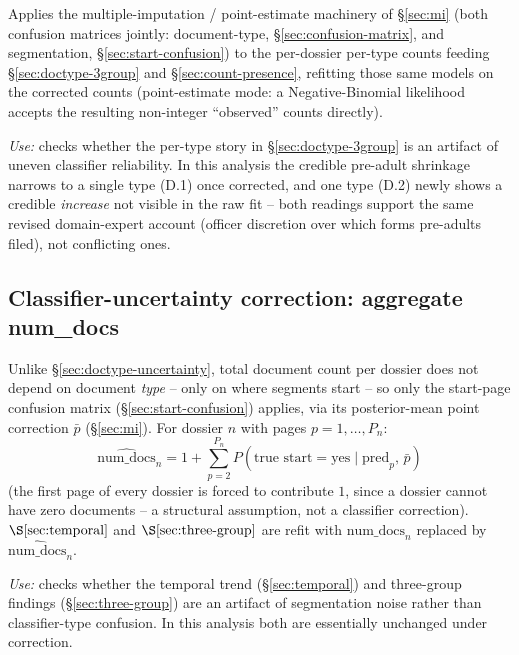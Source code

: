 Applies the multiple-imputation / point-estimate machinery of
\S\ref{sec:mi} (both confusion matrices jointly: document-type,
\S\ref{sec:confusion-matrix}, and segmentation, \S\ref{sec:start-confusion})
to the per-dossier per-type counts feeding \S\ref{sec:doctype-3group} and
\S\ref{sec:count-presence}, refitting those same models on the corrected
counts (point-estimate mode: a Negative-Binomial likelihood accepts the
resulting non-integer ``observed'' counts directly).

\textit{Use:} checks whether the per-type story in \S\ref{sec:doctype-3group}
is an artifact of uneven classifier reliability. In this analysis the
credible pre-adult shrinkage narrows to a single type (D.1) once corrected,
and one type (D.2) newly shows a credible \emph{increase} not visible in the
raw fit -- both readings support the same revised domain-expert account
(officer discretion over which forms pre-adults filed), not conflicting
ones.

\subsection{Classifier-uncertainty correction: aggregate num\_docs}
\label{sec:aggregate-uncertainty}

Unlike \S\ref{sec:doctype-uncertainty}, total document count per dossier
does not depend on document \emph{type} -- only on where segments start --
so only the start-page confusion matrix (\S\ref{sec:start-confusion})
applies, via its posterior-mean point correction $\bar p$
(\S\ref{sec:mi}). For dossier $n$ with pages $p=1,\dots,P_n$:
\begin{equation}
  \widehat{\text{num\_docs}}_n = 1 + \sum_{p=2}^{P_n} P(\text{true start}=\text{yes} \mid \text{pred}_p,\, \bar p)
\end{equation}
(the first page of every dossier is forced to contribute $1$, since a
dossier cannot have zero documents -- a structural assumption, not a
classifier correction). $\S\ref{sec:temporal}$ and $\S\ref{sec:three-group}$
are refit with $\text{num\_docs}_n$ replaced by $\widehat{\text{num\_docs}}_n$.

\textit{Use:} checks whether the temporal trend (\S\ref{sec:temporal}) and
three-group findings (\S\ref{sec:three-group}) are an artifact of
segmentation noise rather than classifier-type confusion. In this analysis
both are essentially unchanged under correction.
